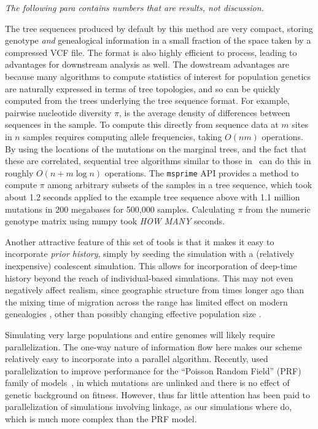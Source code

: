 \documentclass{article}
\newcommand{\msprime}{\texttt{msprime}}
\newcommand{\krt}[1]{{\em \color{green} #1}}
\newcommand{\plr}[1]{{\em \color{blue} #1}}
\begin{document}
\krt{The following para contains numbers that are results, not discussion.}

The tree sequences produced by default by this method
are very compact, storing genotype \emph{and} genealogical information
in a small fraction of the space taken by a compressed VCF file.
The format is also highly efficient to process,
leading to advantages for downstream analysis as well.
The dowstream advantages are because many algorithms to compute statistics of interest for population genetics
are naturally expressed in terms of tree topologies,
and so can be quickly computed from the trees underlying the tree sequence format.
For example, pairwise nucleotide diversity $\pi$, is the average density of
differences between sequences in the sample.
To compute this directly from sequence data at $m$ sites in $n$ samples
requires computing allele frequencies, taking $O(nm)$ operations.
By using the locations of the mutations on the marginal trees,
and the fact that these are correlated,
sequential tree algorithms similar to those in~\citep{kelleher2016efficient}
can do this in roughly $O(n + m \log n)$ operations.
The \msprime{} API provides a method to compute $\pi$ among arbitrary subsets of the
samples in a tree sequence, which took about 1.2 seconds
applied to the example tree sequence above with 1.1 million mutations
in 200 megabases for 500,000 samples.
Calculating $\pi$ from the numeric genotype matrix using numpy took \plr{HOW MANY} seconds.

Another attractive feature of this set of tools
is that it makes it easy to incorporate \emph{prior history},
simply by seeding the simulation with a (relatively inexpensive) coalescent simulation.
This allows for incorporation of deep-time history beyond the reach of individual-based simulations.
This may not even negatively affect realism,
since geographic structure from times longer ago than the mixing
time of migration across the range has limited effect on modern genealogies
\citep{wilkins2004separation},
other than possibly changing effective population size \citep{barton2002neutral,cox2002stepping}.

Simulating very large populations and entire genomes will likely require parallelization.
The one-way nature of information flow here makes our scheme relatively easy to incorporate
into a parallel algorithm.
Recently, \citet{lawrie2017accelerating} used parallelization
to improve performance for the ``Poisson Random Field'' (PRF) family of models~\citep{Sawyer1992-jw},
in which mutations are unlinked and there is no effect of genetic background on fitness.
However, thus far little attention has been paid to parallelization of simulations involving linkage, as our simulations
where do, which is much more
complex than the PRF model. 
\end{document}

